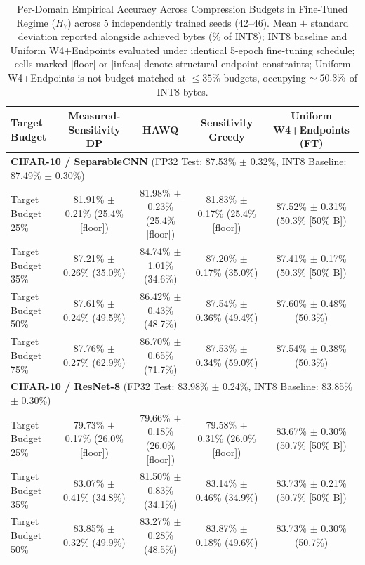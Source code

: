 \begin{table}[!t]
\centering
\caption{Per-Domain Empirical Accuracy Across Compression Budgets in Fine-Tuned Regime ($H_7$) across 5 independently trained seeds (42--46). Mean $\pm$ standard deviation reported alongside achieved bytes (\% of INT8); INT8 baseline and Uniform W4+Endpoints evaluated under identical 5-epoch fine-tuning schedule; cells marked [floor] or [infeas] denote structural endpoint constraints; Uniform W4+Endpoints is not budget-matched at $\le 35\%$ budgets, occupying $\sim 50.3\%$ of INT8 bytes.}
\label{tab:multitask_results}
\scriptsize
\setlength{\tabcolsep}{2.5pt}
\begin{tabular}{lcccc}
\toprule
\textbf{Target Budget} & \textbf{Measured-Sensitivity DP} & \textbf{HAWQ} & \textbf{Sensitivity Greedy} & \textbf{Uniform W4+Endpoints (FT)} \\
\midrule
\multicolumn{5}{l}{\textbf{CIFAR-10 / SeparableCNN} (FP32 Test: 87.53\% $\pm$ 0.32\%, INT8 Baseline: 87.49\% $\pm$ 0.30\%)}\\
\quad Target Budget 25\% & 81.91\% $\pm$ 0.21\% (25.4\% [floor]) & 81.98\% $\pm$ 0.23\% (25.4\% [floor]) & 81.83\% $\pm$ 0.17\% (25.4\% [floor]) & 87.52\% $\pm$ 0.31\% (50.3\% [50\% B]) \\
\quad Target Budget 35\% & 87.21\% $\pm$ 0.26\% (35.0\%) & 84.74\% $\pm$ 1.01\% (34.6\%) & 87.20\% $\pm$ 0.17\% (35.0\%) & 87.41\% $\pm$ 0.17\% (50.3\% [50\% B]) \\
\quad Target Budget 50\% & 87.61\% $\pm$ 0.24\% (49.5\%) & 86.42\% $\pm$ 0.43\% (48.7\%) & 87.54\% $\pm$ 0.36\% (49.4\%) & 87.60\% $\pm$ 0.48\% (50.3\%) \\
\quad Target Budget 75\% & 87.76\% $\pm$ 0.27\% (62.9\%) & 86.70\% $\pm$ 0.65\% (71.7\%) & 87.53\% $\pm$ 0.34\% (59.0\%) & 87.54\% $\pm$ 0.38\% (50.3\%) \\
\midrule
\multicolumn{5}{l}{\textbf{CIFAR-10 / ResNet-8} (FP32 Test: 83.98\% $\pm$ 0.24\%, INT8 Baseline: 83.85\% $\pm$ 0.30\%)}\\
\quad Target Budget 25\% & 79.73\% $\pm$ 0.17\% (26.0\% [floor]) & 79.66\% $\pm$ 0.18\% (26.0\% [floor]) & 79.58\% $\pm$ 0.31\% (26.0\% [floor]) & 83.67\% $\pm$ 0.30\% (50.7\% [50\% B]) \\
\quad Target Budget 35\% & 83.07\% $\pm$ 0.41\% (34.8\%) & 81.50\% $\pm$ 0.83\% (34.1\%) & 83.14\% $\pm$ 0.46\% (34.9\%) & 83.73\% $\pm$ 0.21\% (50.7\% [50\% B]) \\
\quad Target Budget 50\% & 83.85\% $\pm$ 0.32\% (49.9\%) & 83.27\% $\pm$ 0.28\% (48.5\%) & 83.87\% $\pm$ 0.18\% (49.6\%) & 83.73\% $\pm$ 0.30\% (50.7\%) \\

\end{tabular}
\end{table}
